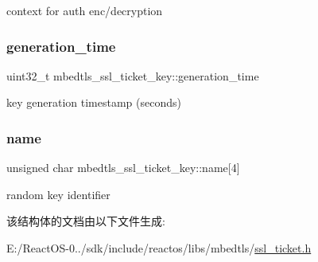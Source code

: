 context for auth enc/decryption \mbox{\label{structmbedtls__ssl__ticket__key_ada9d97d06d4c215e4810880427ca50ad}} 
\subsubsection{\texorpdfstring{generation\+\_\+time}{generation\_time}}
{\footnotesize\ttfamily uint32\+\_\+t mbedtls\+\_\+ssl\+\_\+ticket\+\_\+key\+::generation\+\_\+time}

key generation timestamp (seconds) \mbox{\label{structmbedtls__ssl__ticket__key_a5c80ec11a07ab4e19e775f7586a11d21}} 
\subsubsection{\texorpdfstring{name}{name}}
{\footnotesize\ttfamily unsigned char mbedtls\+\_\+ssl\+\_\+ticket\+\_\+key\+::name\mbox{[}4\mbox{]}}

random key identifier 

该结构体的文档由以下文件生成\+:\begin{DoxyCompactItemize}
\item 
E\+:/\+React\+O\+S-\/0../sdk/include/reactos/libs/mbedtls/\hyperlink{ssl__ticket_8h}{ssl\+\_\+ticket.\+h}\end{DoxyCompactItemize}
